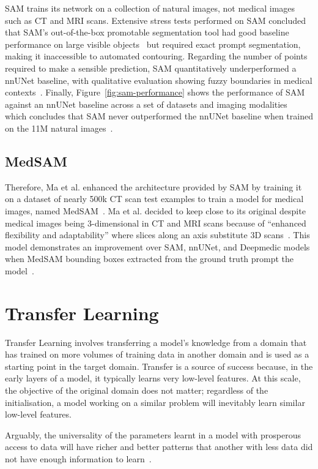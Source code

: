 \documentclass[12pt,twoside]{report}
\begin{document}
SAM trains its network on a collection of natural images, not medical images such as CT and MRI scans. Extensive stress tests performed on SAM concluded that SAM's out-of-the-box promotable segmentation tool had good baseline performance on large visible objects~\cite{deng2023segment} but required exact prompt segmentation, making it inaccessible to automated contouring. Regarding the number of points required to make a sensible prediction, SAM quantitatively underperformed a nnUNet baseline, with qualitative evaluation showing fuzzy boundaries in medical contexts~\cite{hu2023sam}. Finally, Figure~\ref{fig:sam-performance} shows the performance of SAM against an nnUNet baseline across a set of datasets and imaging modalities~\cite{he2023computervision} which concludes that SAM never outperformed the nnUNet baseline when trained on the 11M natural images~\cite{SAM}. 

\subsection{MedSAM}\label{sect:medsam}

Therefore, Ma et al. enhanced the architecture provided by SAM by training it on a dataset of nearly 500k CT scan test examples to train a model for medical images, named MedSAM~\cite{Ma2024}. Ma et al. decided to keep close to its original despite medical images being 3-dimensional in CT and MRI scans because of ``enhanced flexibility and adaptability'' where slices along an axis substitute 3D scans~\cite{Ma2024}. This model demonstrates an improvement over SAM, nnUNet, and Deepmedic models when MedSAM bounding boxes extracted from the ground truth prompt the model~\cite{Ma2024}.

\section{Transfer Learning}

Transfer Learning involves transferring a model's knowledge from a domain that has trained on more volumes of training data in another domain and is used as a starting point in the target domain. Transfer is a source of success because, in the early layers of a model, it typically learns very low-level features. At 
this scale, the objective of the original domain does not matter; regardless of the initialisation, a model working on a similar problem will inevitably learn similar low-level features. 

Arguably, the universality of the parameters learnt in a model with prosperous access to data will have richer and better patterns that another with less data did not have enough information to learn~\cite{deep-learning-book, survey-on-transfer-learning}.
\end{document}
